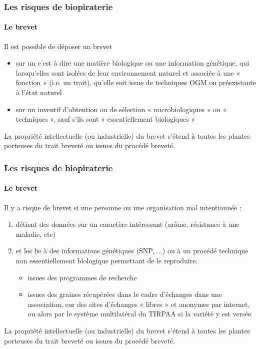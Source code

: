 \begin{frame}
\frametitle{Les risques de biopiraterie}
\framesubtitle{Le brevet}

Il est possible de déposer un brevet
\begin{itemize}
\item sur un  c'est à dire une matière biologique ou une information génétique, qui lorsqu'elles sont isolées de leur environnement naturel et associée à une « fonction » (i.e. un trait), qu'elle soit issue de techniques OGM ou préexistante à l'état naturel %
\item sur un  inventif d'obtention ou de sélection « microbiologiques » ou « techniques », sauf s'ils sont « essentiellement biologiques »
\end{itemize}

\begin{block}{}
La propriété intellectuelle (ou industrielle) du brevet s’étend à toutes les plantes porteuses du trait breveté ou issues du procédé breveté.
\end{block}

\end{frame}


\begin{frame} 
\frametitle{Les risques de biopiraterie}
\framesubtitle{Le brevet}

Il y a risque de brevet si une personne ou une organisation mal intentionnée :

\begin{enumerate}
\item détient des données sur un caractère intéressant (arôme, résistance à une maladie, etc)

\item et les lie à des informations génétiques (SNP, ...) ou à un procédé technique non essentiellement biologique permettant de le reproduire.
\begin{itemize}
\item issues des programmes de recherche
\item issues des graines récupérées dans le cadre d'échanges dans une association, sur des sites d'échanges « libres » et anonymes par internet, ou alors par le système multilatéral du TIRPAA si la variété y est versée
\end{itemize}

\end{enumerate}

\begin{block}{}
La propriété intellectuelle (ou industrielle) du brevet s’étend à toutes les plantes porteuses du trait breveté ou issues du procédé breveté.
\end{block}

\end{frame}



